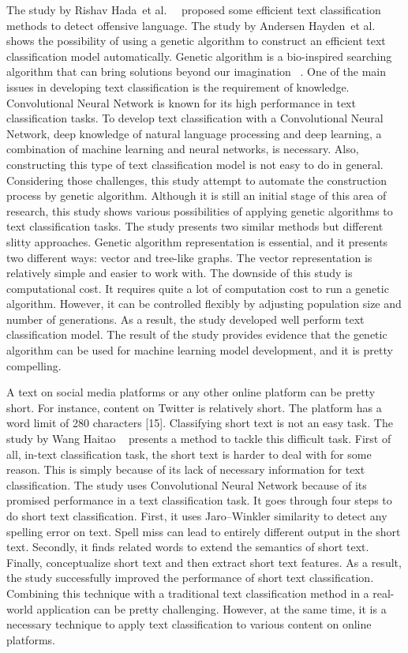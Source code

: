 \documentclass[12pt, natbib=false]{article}
\begin{document}
The study by Rishav Hada et al. ~\cite{hada2021ruddit} proposed some efficient text classification methods to detect offensive language.
The study by Andersen Hayden et al. ~\cite{andersen2021evolving} shows the possibility of using a genetic algorithm to construct an efficient text classification model automatically.
Genetic algorithm is a bio-inspired searching algorithm that can bring solutions beyond our imagination ~\cite{alehman2020surprising}.
One of the main issues in developing text classification is the requirement of knowledge.
Convolutional Neural Network is known for its high performance in text classification tasks. To develop text classification with a Convolutional Neural Network, deep knowledge of natural language processing and deep learning, a combination of machine learning and neural networks, is necessary.
Also, constructing this type of text classification model is not easy to do in general. Considering those challenges, this study attempt to automate the construction process by genetic algorithm.
Although it is still an initial stage of this area of research, this study shows various possibilities of applying genetic algorithms to text classification tasks.
The study presents two similar methods but different slitty approaches. Genetic algorithm representation is essential, and it presents two different ways: vector and tree-like graphs.
The vector representation is relatively simple and easier to work with.
The downside of this study is computational cost.
It requires quite a lot of computation cost to run a genetic algorithm.
However, it can be controlled flexibly by adjusting population size and number of generations.
As a result, the study developed well perform text classification model.
The result of the study provides evidence that the genetic algorithm can be used for machine learning model development, and it is pretty compelling. 

A text on social media platforms or any other online platform can be pretty short. For instance, content on Twitter is relatively short. The platform has a word limit of 280 characters [15].
Classifying short text is not an easy task.
The study by Wang Haitao ~\cite{wang2021short} presents a method to tackle this difficult task.
First of all, in-text classification task, the short text is harder to deal with for some reason. This is simply because of its lack of necessary information for text classification.
The study uses Convolutional Neural Network because of its promised performance in a text classification task. It goes through four steps to do short text classification.
First, it uses Jaro–Winkler similarity to detect any spelling error on text. Spell miss can lead to entirely different output in the short text.
Secondly, it finds related words to extend the semantics of short text. Finally, conceptualize short text and then extract short text features.
As a result, the study successfully improved the performance of short text classification.
Combining this technique with a traditional text classification method in a real-world application can be pretty challenging.
However, at the same time, it is a necessary technique to apply text classification to various content on online platforms. 
\end{document}
